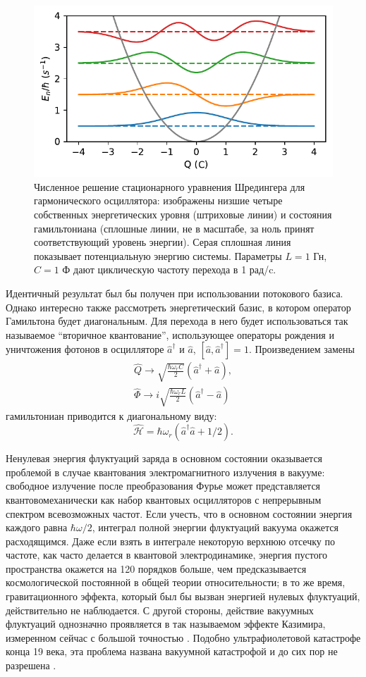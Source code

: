\documentclass[14pt, a4paper]{extreport}
\numberwithin{equation}{section}
\begin{document}
\begin{figure}
	\centering
	\includegraphics[width=.6\linewidth]{planck_oscillator}
	\caption{Численное решение стационарного уравнения Шредингера для гармонического осциллятора: изображены низшие четыре собственных энергетических уровня (штриховые линии) и состояния гамильтониана (сплошные линии, не в масштабе, за ноль принят соответствующий уровень энергии). Серая сплошная линия показывает потенциальную энергию системы. Параметры $L = 1$ Гн, $ C = 1$ Ф дают циклическую частоту перехода в 1 рад/c.}
	\label{fig:planck_oscillator}
\end{figure}


Идентичный результат был бы получен при использовании потокового базиса. Однако интересно также рассмотреть энергетический базис, в котором оператор Гамильтона будет диагональным. Для перехода в него будет использоваться так называемое ``вторичное квантование'', использующее операторы рождения и уничтожения фотонов в осцилляторе $\hat a^\dag$ и $\hat a$, $[\hat a, \hat a^\dag] = 1$. Произведением замены 
\begin{align}
	\hat Q \rightarrow \sqrt{\frac{\hbar \omega_r C}{2}}(\hat a^\dag + \hat a),\\
	\hat \Phi \rightarrow i\sqrt{\frac{\hbar \omega_r L}{2}}(\hat a^\dag - \hat a)
\end{align}
гамильтониан приводится к диагональному виду:
\begin{equation}
	\hat{\mathcal H} =  \hbar \omega_r (\hat a^\dag \hat a + 1/2).
\end{equation}

Ненулевая энергия флуктуаций заряда в основном состоянии оказывается проблемой в случае квантования электромагнитного излучения в вакууме: свободное излучение после преобразования Фурье может представляется квантовомеханически как набор квантовых осцилляторов с непрерывным спектром всевозможных частот. Если учесть, что в основном состоянии энергия каждого равна $\hbar \omega/2$, интеграл полной энергии флуктуаций вакуума окажется расходящимся. Даже если взять в интеграле некоторую верхнюю отсечку по частоте, как часто делается в квантовой электродинамике, энергия пустого пространства окажется на 120 порядков больше, чем предсказывается космологической постоянной в общей теории относительности; в то же время, гравитационного эффекта, который был бы вызван энергией нулевых флуктуаций, действительно не наблюдается. С другой стороны, действие вакуумных флуктуаций однозначно проявляется в так называемом эффекте Казимира, измеренном сейчас с большой точностью \cite{zou2013casimir}. Подобно ультрафиолетовой катастрофе конца 19 века, эта проблема названа вакуумной катастрофой и до сих пор не разрешена \cite{adler1995vacuum}.
\end{document}
